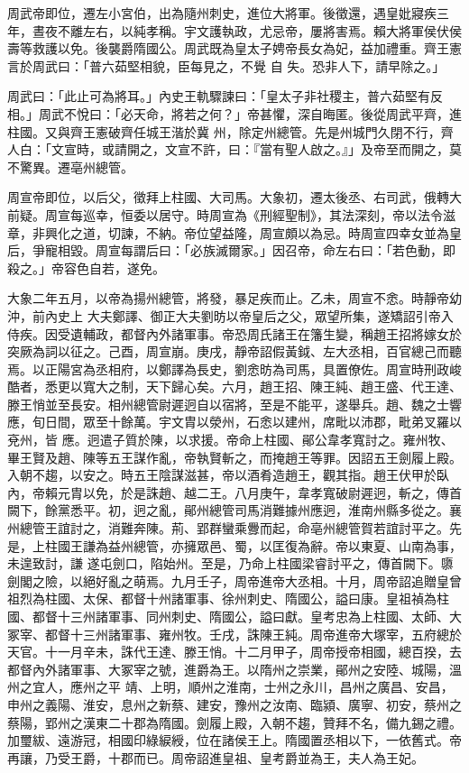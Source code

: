 \begin{pinyinscope}
 周武帝即位，遷左小宮伯，出為隨州刺史，進位大將軍。後徵還，遇皇妣寢疾三年，晝夜不離左右，以純孝稱。宇文護執政，尤忌帝，屢將害焉。賴大將軍侯伏侯壽等救護以免。後襲爵隋國公。周武既為皇太子娉帝長女為妃，益加禮重。齊王憲言於周武曰：「普六茹堅相貌，臣每見之，不覺
 自
 失。恐非人下，請早除之。」



 周武曰：「此止可為將耳。」內史王軌驟諫曰：「皇太子非社稷主，普六茹堅有反相。」周武不悅曰：「必天命，將若之何？」帝甚懼，深自晦匿。後從周武平齊，進柱國。又與齊王憲破齊任城王湝於冀
 州，除定州總管。先是州城門久閉不行，齊人白：「文宣時，或請開之，文宣不許，曰：『當有聖人啟之。』」及帝至而開之，莫不驚異。遷亳州總管。



 周宣帝即位，以后父，徵拜上柱國、大司馬。大象初，遷太後丞、右司武，俄轉大前疑。周宣每巡幸，恒委以居守。時周宣為《刑經聖制》，其法深刻，帝以法令滋章，非興化之道，切諫，不納。帝位望益隆，周宣頗以為忌。時周宣四幸女並為皇后，爭寵相毀。周宣每謂后曰：「必族滅爾家。」因召帝，命左右曰：「若色動，即殺之。」帝容色自若，遂免。



 大象二年五月，以帝為揚州總管，將發，暴足疾而止。乙未，周宣不悆。時靜帝幼沖，前內史上
 大夫鄭譯、御正大夫劉昉以帝皇后之父，眾望所集，遂矯詔引帝入侍疾。因受遺輔政，都督內外諸軍事。帝恐周氏諸王在籓生變，稱趙王招將嫁女於突厥為詞以征之。己酉，周宣崩。庚戌，靜帝詔假黃鉞、左大丞相，百官總己而聽焉。以正陽宮為丞相府，以鄭譯為長史，劉悆昉為司馬，具置僚佐。周宣時刑政峻酷者，悉更以寬大之制，天下歸心矣。六月，趙王招、陳王純、趙王盛、代王達、滕王悄並至長安。相州總管尉遲迥自以宿將，至是不能平，遂舉兵。趙、魏之士響應，旬日間，眾至十餘萬。宇文胄以滎州，石悆以建州，席毗以沛郡，毗弟叉羅以兗州，皆
 應。迥遣子質於陳，以求援。帝命上柱國、鄖公韋孝寬討之。雍州牧、畢王賢及趙、陳等五王謀作亂，帝執賢斬之，而掩趙王等罪。因詔五王劍履上殿。入朝不趨，以安之。時五王陰謀滋甚，帝以酒肴造趙王，觀其指。趙王伏甲於臥內，帝賴元胄以免，於是誅趙、越二王。八月庚午，韋孝寬破尉遲迥，斬之，傳首闕下，餘黨悉平。初，迥之亂，鄖州總管司馬消難據州應迥，淮南州縣多從之。襄州總管王誼討之，消難奔陳。荊、郢群蠻乘釁而起，命亳州總管賀若誼討平之。先是，上柱國王謙為益州總管，亦擁眾邑、蜀，以匡復為辭。帝以東夏、山南為事，未遑致討，謙
 遂屯劍口，陷始州。至是，乃命上柱國梁睿討平之，傳首闕下。隳劍閣之險，以絕好亂之萌焉。九月壬子，周帝進帝大丞相。十月，周帝詔追贈皇曾祖烈為柱國、太保、都督十州諸軍事、徐州刺史、隋國公，謚曰康。皇祖禎為柱國、都督十三州諸軍事、同州刺史、隋國公，謚曰獻。皇考忠為上柱國、太師、大冢宰、都督十三州諸軍事、雍州牧。壬戌，誅陳王純。周帝進帝大塚宰，五府總於天官。十一月辛未，誅代王達、滕王悄。十二月甲子，周帝授帝相國，總百揆，去都督內外諸軍事、大冢宰之號，進爵為王。以隋州之崇業，鄖州之安陸、城陽，溫州之宜人，應州之平
 靖、上明，順州之淮南，士州之永川，昌州之廣昌、安昌，申州之義陽、淮安，息州之新蔡、建安，豫州之汝南、臨潁、廣寧、初安，蔡州之蔡陽，郢州之漢東二十郡為隋國。劍履上殿，入朝不趨，贊拜不名，備九錫之禮。加璽紱、遠游冠，相國印綠綟綬，位在諸侯王上。隋國置丞相以下，一依舊式。帝再讓，乃受王爵，十郡而已。周帝詔進皇祖、皇考爵並為王，夫人為王妃。




\end{pinyinscope}
